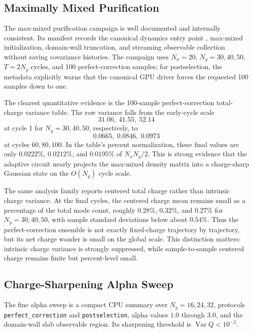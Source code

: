 \documentclass[aps,prb,onecolumn,nofootinbib,superscriptaddress]{revtex4-2}
\begin{document}
\subsection{Maximally Mixed Purification}

The max-mixed purification campaign is well documented and internally consistent.  Its manifest records the canonical dynamics entry point , max-mixed initialization, domain-wall truncation, and streaming observable collection without saving covariance histories.  The campaign uses $N_x=20$, $N_y=30,40,50$, $T=2N_y$ cycles, and 100 perfect-correction samples; for postselection, the metadata explicitly warns that the canonical GPU driver forces the requested 100 samples down to one.

The clearest quantitative evidence is the 100-sample perfect-correction total-charge variance table.  The raw variance falls from the early-cycle scale
\[
31.06,\;41.55,\;52.14
\]
at cycle 1 for $N_y=30,40,50$, respectively, to
\[
0.0665,\;0.0846,\;0.0973
\]
at cycles $60,80,100$.  In the table's percent normalization, these final values are only $0.0222\%$, $0.0212\%$, and $0.0195\%$ of $N_xN_y/2$.  This is strong evidence that the adaptive circuit nearly projects the max-mixed density matrix into a charge-sharp Gaussian state on the $O(N_y)$ cycle scale.

The same analysis family reports centered total charge rather than intrinsic charge variance.  At the final cycles, the centered charge mean remains small as a percentage of the total mode count, roughly $0.28\%$, $0.32\%$, and $0.27\%$ for $N_y=30,40,50$, with sample standard deviations below about $0.54\%$.  Thus the perfect-correction ensemble is not exactly fixed-charge trajectory by trajectory, but its net charge wander is small on the global scale.  This distinction matters: intrinsic charge variance is strongly suppressed, while sample-to-sample centered charge remains finite but percent-level small.

\subsection{Charge-Sharpening Alpha Sweep}

The fine alpha sweep is a compact CPU summary over $N_y=16,24,32$, protocols \texttt{perfect\_correction} and \texttt{postselection}, alpha values $1.0$ through $3.0$, and the domain-wall slab observable region.  Its sharpening threshold is $\operatorname{Var}Q<10^{-2}$.
\end{document}
